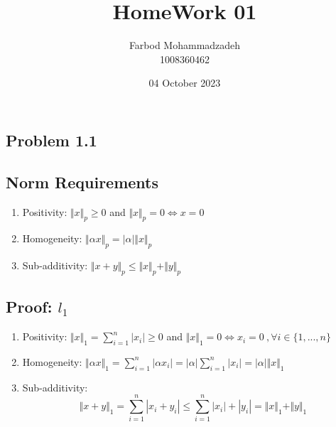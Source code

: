 \documentclass[20pt]{article}
\title{HomeWork 01}
\author{Farbod Mohammadzadeh\\
    1008360462}
\date{04 October 2023}
\begin{document}
\begin{Large}


    \maketitle

    \newpage

    \section*{Problem 1.1}


    \subsection*{Norm Requirements}
    \begin{enumerate}
        \item Positivity: $\Vert x \Vert_p \geq 0$ and $\Vert x \Vert_p = 0 \iff x = 0$
        \item Homogeneity: $\Vert \alpha x \Vert_p = |\alpha| \Vert x \Vert_p$
        \item Sub-additivity: $\Vert x + y \Vert_p \leq \Vert x \Vert_p + \Vert y \Vert_p$
    \end{enumerate}

    \subsection*{Proof: $l_1$}

    \begin{enumerate}
        \item Positivity: $\Vert x \Vert_1 = \sum_{i=1}^{n} |x_i| \geq 0$ and $\Vert x \Vert_1 = 0 \iff x_i = 0\ ,  \forall i \in \{1,...,n\}  $

        \item Homogeneity: $\Vert \alpha x \Vert_1 = \sum_{i=1}^{n} |\alpha x_i| = |\alpha| \sum_{i=1}^{n} |x_i| = |\alpha| \Vert x \Vert_1$
        \item Sub-additivity:
              \[ \Vert x + y \Vert_1 = \sum_{i=1}^{n} |x_i + y_i| \leq \sum_{i=1}^{n} |x_i| + |y_i| = \Vert x \Vert_1 + \Vert y \Vert_1\]


    \end{enumerate}

\end{Large}
\end{document}
